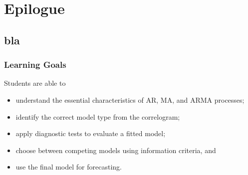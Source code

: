 %
%
%

\section{Epilogue}\subsection*{bla}
\begin{frame}\frametitle{Learning Goals}
Students are able to
\begin{itemize}
\item understand the essential characteristics of AR, MA, and ARMA processes;
\item identify the correct model type from the correlogram;
\item apply diagnostic tests to evaluate a fitted model;
\item choose between competing models using information criteria, and
\item use the final model for forecasting.
\end{itemize}
\end{frame}

 